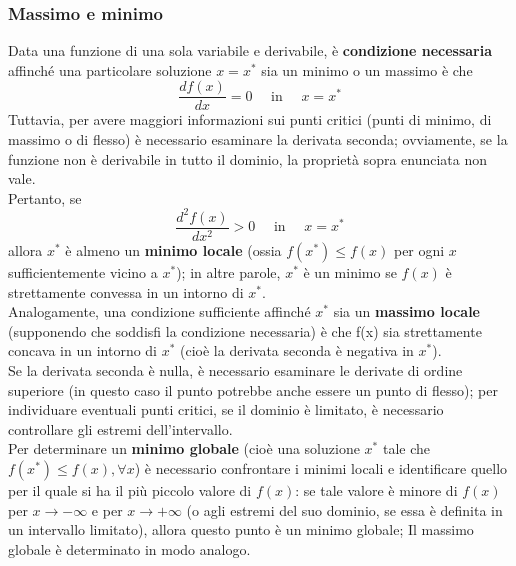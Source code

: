 \documentclass[a4paper]{extarticle}
\begin{document}
\subsubsection{Massimo e minimo}
Data una funzione di una sola variabile e derivabile, è \textbf{condizione necessaria} affinché una particolare soluzione $x=x^*$ sia un minimo o un massimo è che
\[\frac{d f(x)}{dx}=0 \hspace{1em} \text{ in } \hspace{1em} x=x^*\]
Tuttavia, per avere maggiori informazioni sui punti critici (punti di minimo, di massimo o di flesso) è necessario esaminare la derivata seconda; ovviamente, se la funzione non è derivabile in tutto il dominio, la proprietà sopra enunciata non vale.\\
Pertanto, se
\[\frac{d^2 f(x)}{dx^2} > 0 \hspace{1em} \text{ in } \hspace{1em} x=x^*\]
allora $x^*$ è almeno un \textbf{minimo locale} (ossia $f(x^*) \leq f(x)$ per ogni $x$ sufficientemente vicino a $x^*$); in altre parole, $x^*$ è un minimo se $f(x)$ è strettamente convessa in un intorno di $x^*$.\\
Analogamente, una condizione sufficiente affinché $x^*$ sia un \textbf{massimo locale} (supponendo che soddisfi la condizione necessaria) è che f(x) sia strettamente concava in un intorno di $x^*$ (cioè la derivata seconda è negativa in $x^*$).\\
Se la derivata seconda è nulla, è necessario esaminare le derivate di ordine superiore (in questo caso il punto potrebbe anche essere un punto di flesso); per individuare eventuali punti critici, se il dominio è limitato, è necessario controllare gli estremi dell'intervallo.\\
Per determinare un \textbf{minimo globale} (cioè una soluzione $x^*$ tale che $f(x^*) \leq f(x), \forall x$) è necessario confrontare i minimi locali e identificare quello per il quale si ha il più piccolo valore di $f(x)$: se tale valore è minore di $f(x)$ per $x \to -\infty$ e per $x \to +\infty$ (o agli estremi del suo dominio, se essa è definita in un intervallo limitato), allora questo punto è un minimo globale; Il massimo globale è determinato in modo analogo.
\end{document}
